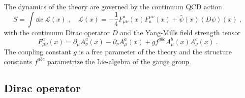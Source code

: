 The dynamics of the theory are governed by the continuum QCD action~\cite{yangmills1954}
\begin{equation} \label{eq:continuum:YM:action}
S = \int \dd x \; \mathcal{L}(x) \;,
\quad
\mathcal{L}(x) = - \frac{1}{4} F^{a}_{\mu \nu}(x) F_{a}^{\mu \nu}(x) + \bar{\psi}(x) (D \psi)(x) \;,
\end{equation}
with the continuum Dirac operator $D$ and the Yang-Mills field strength tensor
\begin{equation}
F_{\mu \nu}^{a}(x) = \partial_{\mu} A_{\nu}^{a}(x) -\partial_{\nu} A_{\mu}^{a}(x) + g f^{abc} A_{\mu}^{b}(x) A_{\nu}^{c}(x) \;.
\end{equation}
The coupling constant $g$ is a free parameter of the theory and the structure constants $f^{abc}$ parametrize the Lie-algebra of the gauge group.

\subsection{Dirac operator}


